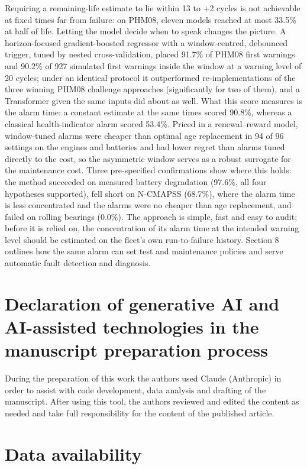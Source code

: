 \documentclass[a4paper,fleqn,doubleblind]{cas-dc}
\begin{document}
Requiring a remaining-life estimate to lie within \textminus{}13 to +2 cycles is not achievable at fixed times far from failure: on PHM08, eleven models reached at most 33.5\% at half of life. Letting the model decide when to speak changes the picture. A horizon-focused gradient-boosted regressor with a window-centred, debounced trigger, tuned by nested cross-validation, placed 91.7\% of PHM08 first warnings and 90.2\% of 927 simulated first warnings inside the window at a warning level of 20 cycles; under an identical protocol it outperformed re-implementations of the three winning PHM08 challenge approaches (significantly for two of them), and a Transformer given the same inputs did about as well. What this score measures is the alarm time: a constant estimate at the same times scored 90.8\%, whereas a classical health-indicator alarm scored 53.4\%. Priced in a renewal--reward model, window-tuned alarms were cheaper than optimal age replacement in 94 of 96 settings on the engines and batteries and had lower regret than alarms tuned directly to the cost, so the asymmetric window serves as a robust surrogate for the maintenance cost. Three pre-specified confirmations show where this holds: the method succeeded on measured battery degradation (97.6\%, all four hypotheses supported), fell short on N-CMAPSS (68.7\%), where the alarm time is less concentrated and the alarms were no cheaper than age replacement, and failed on rolling bearings (0.0\%). The approach is simple, fast and easy to audit; before it is relied on, the concentration of its alarm time at the intended warning level should be estimated on the fleet's own run-to-failure history. Section 8 outlines how the same alarm can set test and maintenance policies and serve automatic fault detection and diagnosis.

\section*{Declaration of generative AI and AI-assisted technologies in the manuscript preparation process}

\noindent During the preparation of this work the authors used Claude (Anthropic) in order to assist with code development, data analysis and drafting of the manuscript. After using this tool, the authors reviewed and edited the content as needed and take full responsibility for the content of the published article.

\section*{Data availability}
\end{document}
